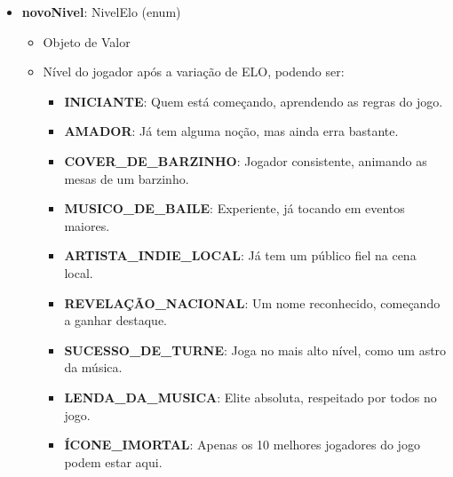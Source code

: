 \begin{itemize}
        \item \textbf{novoNivel}: NivelElo (enum)  
              \begin{itemize}
                  \item Objeto de Valor
                  \item Nível do jogador após a variação de ELO, podendo ser:
                  \begin{itemize}
                      \item \textbf{INICIANTE}: Quem está começando, aprendendo as regras do jogo.
                      \item \textbf{AMADOR}: Já tem alguma noção, mas ainda erra bastante.
                      \item \textbf{COVER\_DE\_BARZINHO}: Jogador consistente, animando as mesas de um barzinho.
                      \item \textbf{MUSICO\_DE\_BAILE}: Experiente, já tocando em eventos maiores.
                      \item \textbf{ARTISTA\_INDIE\_LOCAL}: Já tem um público fiel na cena local.
                      \item \textbf{REVELAÇÃO\_NACIONAL}: Um nome reconhecido, começando a ganhar destaque.
                      \item \textbf{SUCESSO\_DE\_TURNE}: Joga no mais alto nível, como um astro da música.
                      \item \textbf{LENDA\_DA\_MUSICA}: Elite absoluta, respeitado por todos no jogo.
                      \item \textbf{ÍCONE\_IMORTAL}: Apenas os 10 melhores jogadores do jogo podem estar aqui.
                  \end{itemize}
              \end{itemize}
    \end{itemize}
    
